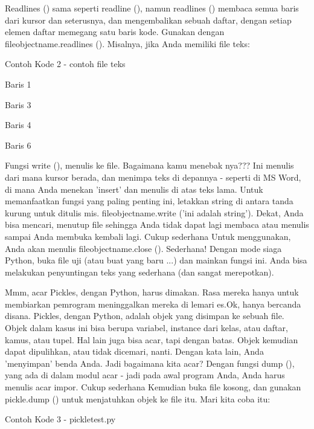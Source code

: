 Readlines () sama seperti readline (), namun readlines () membaca semua baris dari kursor dan seterusnya, dan mengembalikan sebuah daftar, dengan setiap elemen daftar memegang satu baris kode. Gunakan dengan fileobjectname.readlines (). Misalnya, jika Anda memiliki file teks: \par
\noindent 
Contoh Kode 2 - contoh file teks \par
\vspace{12pt}
\noindent 
Baris 1 \par
\vspace{12pt}
\noindent 
Baris 3 \par
\noindent 
Baris 4 \par
\vspace{12pt}
\noindent 
Baris 6 \par
\vspace{12pt}
Fungsi write (), menulis ke file. Bagaimana kamu menebak nya??? Ini menulis dari mana kursor berada, dan menimpa teks di depannya - seperti di MS Word, di mana Anda menekan 'insert' dan menulis di atas teks lama. Untuk memanfaatkan fungsi yang paling penting ini, letakkan string di antara tanda kurung untuk ditulis mis. fileobjectname.write ('ini adalah string'). \hspace*{0.5in} Dekat, Anda bisa mencari, menutup file sehingga Anda tidak dapat lagi membaca atau menulis sampai Anda membuka kembali lagi. Cukup sederhana Untuk menggunakan, Anda akan menulis fileobjectname.close (). Sederhana! Dengan mode siaga Python, buka file uji (atau buat yang baru ...) dan mainkan fungsi ini. Anda bisa melakukan penyuntingan teks yang sederhana (dan sangat merepotkan). \par
Mmm, acar Pickles, dengan Python, harus dimakan. Rasa mereka hanya untuk membiarkan pemrogram meninggalkan mereka di lemari es.Ok, hanya bercanda disana. Pickles, dengan Python, adalah objek yang disimpan ke sebuah file. Objek dalam kasus ini bisa berupa variabel, instance dari kelas, atau daftar, kamus, atau tupel. Hal lain juga bisa acar, tapi dengan batas. Objek kemudian dapat dipulihkan, atau tidak dicemari, nanti. Dengan kata lain, Anda 'menyimpan' benda Anda. Jadi bagaimana kita acar? Dengan fungsi dump (), yang ada di dalam modul acar - jadi pada awal program Anda, Anda harus menulis acar impor. Cukup sederhana Kemudian buka file kosong, dan gunakan pickle.dump () untuk menjatuhkan objek ke file itu. Mari kita coba itu: \par
\noindent 
Contoh Kode 3 - pickletest.py \par
